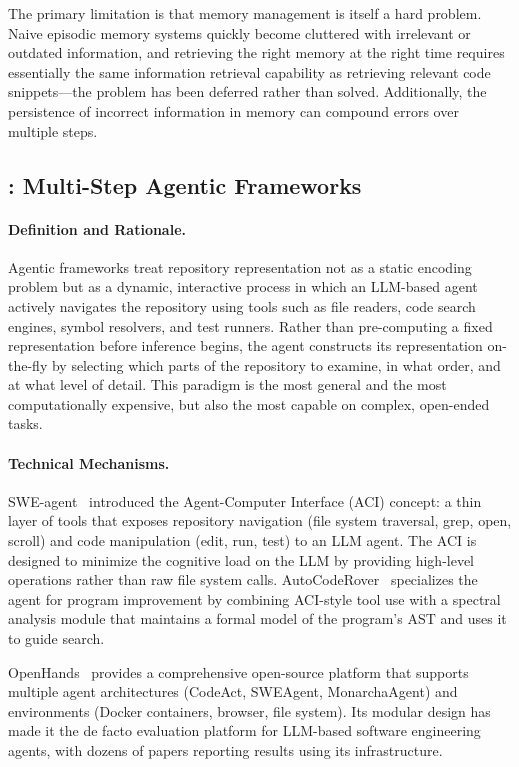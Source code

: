 The primary limitation is that memory management is itself a hard problem. Naive episodic
memory systems quickly become cluttered with irrelevant or outdated information, and retrieving
the right memory at the right time requires essentially the same information retrieval capability
as retrieving relevant code snippets---the problem has been deferred rather than solved.
Additionally, the persistence of incorrect information in memory can compound errors over
multiple steps.

\subsection{: Multi-Step Agentic Frameworks}
\label{subsec:par7}

\paragraph{Definition and Rationale.}
Agentic frameworks treat repository representation not as a static encoding problem but as
a dynamic, interactive process in which an LLM-based agent actively navigates the repository
using tools such as file readers, code search engines, symbol resolvers, and test runners.
Rather than pre-computing a fixed representation before inference begins, the agent constructs
its representation on-the-fly by selecting which parts of the repository to examine, in what
order, and at what level of detail. This paradigm is the most general and the most
computationally expensive, but also the most capable on complex, open-ended tasks.

\paragraph{Technical Mechanisms.}
SWE-agent~\cite{yang2024sweagent} introduced the Agent-Computer Interface (ACI) concept:
a thin layer of tools that exposes repository navigation (file system traversal, grep, open,
scroll) and code manipulation (edit, run, test) to an LLM agent. The ACI is designed to
minimize the cognitive load on the LLM by providing high-level operations rather than raw
file system calls. AutoCodeRover~\cite{zhang2024autocoderover} specializes the agent for
program improvement by combining ACI-style tool use with a spectral analysis module that
maintains a formal model of the program's AST and uses it to guide search.

OpenHands~\cite{wang2025openhands} provides a comprehensive open-source platform that
supports multiple agent architectures (CodeAct, SWEAgent, MonarchaAgent) and environments
(Docker containers, browser, file system). Its modular design has made it the de facto
evaluation platform for LLM-based software engineering agents, with dozens of papers reporting
results using its infrastructure.

